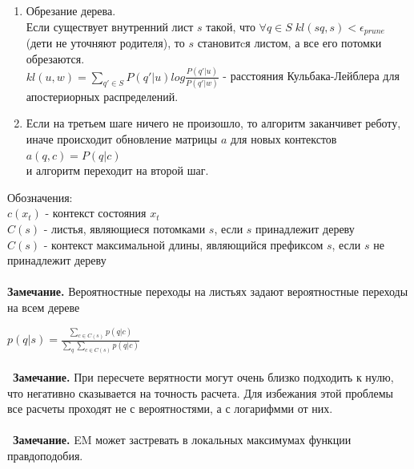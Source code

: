 \documentclass[10pt,a4paper]{article}
\begin{document}
\begin{enumerate}
\item Обрезание дерева.
\\
Если существует внутренний лист $ s $ такой, что $ \forall q \in S \; kl(sq, s) < \epsilon_{prune} $ (дети не уточняют родителя), то $ s $ становитcя листом, а все его потомки обрезаются.
\\
$kl(u, w) = \sum_{q' \in S} P(q'|u) log\frac{P(q'|u)}{P(q'|w)}$ - расстояния Кульбака-Лейблера для апостериорных распределений.
\\
\item Если на третьем шаге ничего не произошло, то алгоритм заканчивет реботу, 
иначе происходит обновление матрицы $ a $ для новых контекстов
\\
$ a(q, c) = P(q| c)$
\\
и алгоритм переходит на второй шаг.
\\
\end{enumerate}
Обозначения: 
\\
$ c(x_{t}) $ - контекст состояния $ x_{t} $ 
\\
$ C(s) $ - листья, являющиеся потомками $ s $, если $ s $ принадлежит дереву 
\\
$ C(s) $ - контекст максимальной длины, являющийся префиксом $ s $, если $ s $ не принадлежит дереву 
\\\\
\textbf{Замечание.}  Вероятностные переходы на листьях задают вероятностные переходы на всем дереве

$ p(q|s) = \frac{\sum_{c \in C(s)} {p(q|c)}}{\sum_q\sum_{c \in C(s)} {p(q|c)}} $ 
\\\\\
\textbf{Замечание.} При пересчете верятности могут очень близко подходить к нулю, что негативно сказывается на точность расчета. Для избежания этой проблемы все расчеты проходят не с вероятностями, а с логарифмми от них.
\\\\\
\textbf{Замечание.} EM может застревать в локальных максимумах функции правдоподобия.
\end{document}
